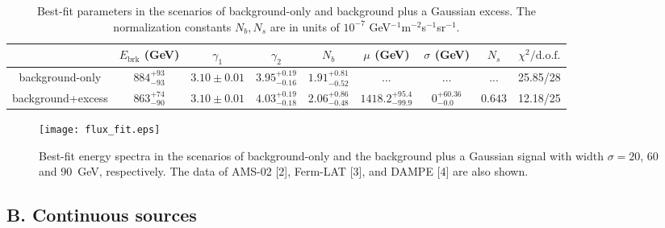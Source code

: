 \begin{table}[htbp]
	\centering
		\begin{tabular}{c|ccccccc|c}
		\hline\hline
		   & $E_{\text{brk}}$ (GeV) & $\gamma_1$ & $\gamma_2$ & $N_b $ & $\mu$ (GeV) &$\sigma$ (GeV) & $N_s$& $\chi^2/\text{d.o.f.}$ \\
		 \hline
		 background-only & $884^{+93}_{-93}$ & $3.10\pm 0.01$ & $3.95^{+0.19}_{-0.16}$& $1.91^{+0.81}_{-0.52}$  & ...&...&...&25.85/28 \\
		background+excess & $863^{+74}_{-90}$& $3.10 \pm0.01$ & $4.03^{+0.19}_{-0.18}$ & $2.06^{+0.86}_{-0.48}$ & $1418.2^{+95.4}_{-99.9}$ & $0^{+60.36}_{-0.0}$ & $0.643$ &12.18/25 \\
		\hline\hline
		\end{tabular}
	\caption{
	Best-fit parameters in the scenarios of background-only and background plus a 
	Gaussian excess. The normalization constants $N_b, N_s$ are in units of 
	$10^{-7}$ GeV$^{-1}$m$^{-2}$s$^{-1}$sr$^{-1}$.}
\label{tab:gaussfree}
\end{table}


\begin{figure}[h]
	\centering
	\texttt{[image: flux\_fit.eps]}
	\caption{
	Best-fit energy spectra in the scenarios of background-only and
	the  background plus a Gaussian signal with width
	$\sigma=20$, 60 and 90~GeV, respectively.
	The data of  AMS-02 [2], %
	Ferm-LAT [3], %
	and 
	DAMPE [4] %
	are also shown.
	}
	\label{fig:flux_SNR_multi}
\end{figure} 

\subsection{B. Continuous sources}

